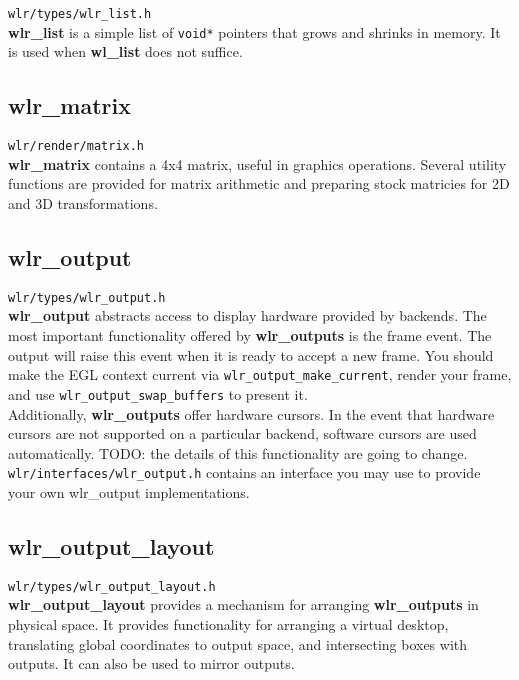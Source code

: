 \documentclass{article}
\newcommand{\code}[1]{\texttt{#1}}
\begin{document}
\code{wlr/types/wlr_list.h}\\

\textbf{wlr_list} is a simple list of \code{void*} pointers that grows and
shrinks in memory. It is used when \textbf{wl_list} does not suffice.

\subsection{wlr_matrix}\label{wlr matrix}

\code{wlr/render/matrix.h}\\

\textbf{wlr_matrix} contains a 4x4 matrix, useful in graphics operations.
Several utility functions are provided for matrix arithmetic and preparing stock
matricies for 2D and 3D transformations.

\subsection{wlr_output}\label{wlr output}

\code{wlr/types/wlr_output.h}\\

\textbf{wlr_output} abstracts access to display hardware provided by backends.
The most important functionality offered by \textbf{wlr_outputs} is the frame
event. The output will raise this event when it is ready to accept a new frame.
You should make the EGL context current via \code{wlr_output_make_current},
render your frame, and use \code{wlr_output_swap_buffers} to present it.\\

Additionally, \textbf{wlr_outputs} offer hardware cursors. In the event that
hardware cursors are not supported on a particular backend, software cursors
are used automatically. TODO: the details of this functionality are going to
change.\\

\code{wlr/interfaces/wlr_output.h} contains an interface you may use to
provide your own wlr_output implementations.

\subsection{wlr_output_layout}\label{wlr output layout}

\code{wlr/types/wlr_output_layout.h}\\

\textbf{wlr_output_layout} provides a mechanism for arranging
\textbf{wlr_outputs} in physical space. It provides functionality for arranging
a virtual desktop, translating global coordinates to output space, and
intersecting boxes with outputs. It can also be used to mirror outputs.
\end{document}
